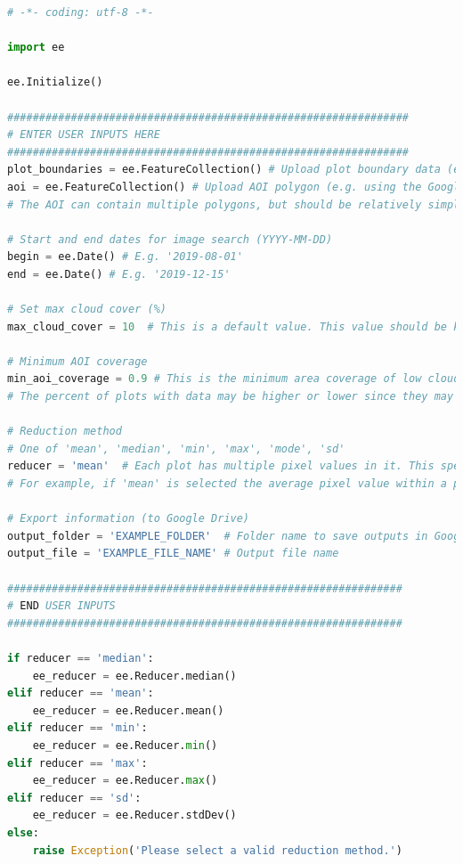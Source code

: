 \documentclass{article}
\begin{document}
\begin{lstlisting}[language=Python] 
# -*- coding: utf-8 -*-

import ee 

ee.Initialize()

###############################################################
# ENTER USER INPUTS HERE  
###############################################################
plot_boundaries = ee.FeatureCollection() # Upload plot boundary data (e.g. using the Google Earth Engine console) and insert the asset ID here, in single or double quotes
aoi = ee.FeatureCollection() # Upload AOI polygon (e.g. using the Google Earth Engine console) and insert the asset ID here, in single or double quotes
# The AOI can contain multiple polygons, but should be relatively simple. A bounding box or convex hull around all plot boundaries is appropriate

# Start and end dates for image search (YYYY-MM-DD)
begin = ee.Date() # E.g. '2019-08-01'
end = ee.Date() # E.g. '2019-12-15'

# Set max cloud cover (%)
max_cloud_cover = 10  # This is a default value. This value should be kept relatively small since high cloud cover can bias results.

# Minimum AOI coverage
min_aoi_coverage = 0.9 # This is the minimum area coverage of low cloud satellite tiles (< max_cloud_cover) calculated against AOI
# The percent of plots with data may be higher or lower since they may not be uniformly distributed in the AOI or plots may be beneath clouds 

# Reduction method
# One of 'mean', 'median', 'min', 'max', 'mode', 'sd'
reducer = 'mean'  # Each plot has multiple pixel values in it. This specifies how a single value should be extracted for each plot on each date.
# For example, if 'mean' is selected the average pixel value within a plot is calculated and passed to the CSV

# Export information (to Google Drive)
output_folder = 'EXAMPLE_FOLDER'  # Folder name to save outputs in Google drive. The folder should be created before running the script.
output_file = 'EXAMPLE_FILE_NAME' # Output file name  

##############################################################
# END USER INPUTS 
##############################################################

if reducer == 'median':
    ee_reducer = ee.Reducer.median()
elif reducer == 'mean':
    ee_reducer = ee.Reducer.mean()
elif reducer == 'min':
    ee_reducer = ee.Reducer.min()
elif reducer == 'max':
    ee_reducer = ee.Reducer.max()
elif reducer == 'sd':
    ee_reducer = ee.Reducer.stdDev()
else:
    raise Exception('Please select a valid reduction method.')



\end{lstlisting}
\end{document}
